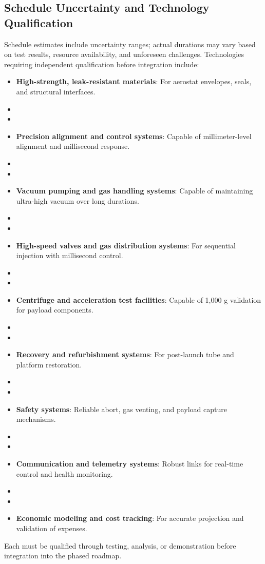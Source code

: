 \subsection{Schedule Uncertainty and Technology Qualification}
Schedule estimates include uncertainty ranges; actual durations may vary based on test results, resource availability, and unforeseen challenges. Technologies requiring independent qualification before integration include:
\begin{itemize}
    \item \textbf{High-strength, leak-resistant materials}: For aerostat envelopes, seals, and structural interfaces.
    \item \item \item \textbf{Precision alignment and control systems}: Capable of millimeter-level alignment and millisecond response.
    \item \item \item \textbf{Vacuum pumping and gas handling systems}: Capable of maintaining ultra-high vacuum over long durations.
    \item \item \item \textbf{High-speed valves and gas distribution systems}: For sequential injection with millisecond control.
    \item \item \item \textbf{Centrifuge and acceleration test facilities}: Capable of 1,000 g validation for payload components.
    \item \item \item \textbf{Recovery and refurbishment systems}: For post-launch tube and platform restoration.
    \item \item \item \textbf{Safety systems}: Reliable abort, gas venting, and payload capture mechanisms.
    \item \item \item \textbf{Communication and telemetry systems}: Robust links for real-time control and health monitoring.
    \item \item \item \textbf{Economic modeling and cost tracking}: For accurate projection and validation of expenses.
\end{itemize}
Each must be qualified through testing, analysis, or demonstration before integration into the phased roadmap.

